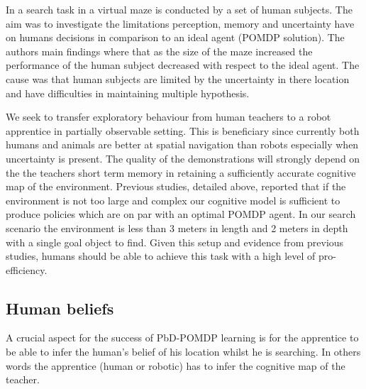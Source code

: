 In \cite{stankiewicz2006lost} a search task in a virtual maze is conducted by a set of human subjects. The aim 
was to investigate the limitations perception, memory and uncertainty have on humans decisions in comparison 
to an ideal agent (POMDP solution). The authors main findings where that as the size of the maze increased the
performance of the human subject decreased with respect to the ideal agent. The cause was that human subjects are limited by the 
uncertainty in there location and have difficulties in maintaining multiple hypothesis.

We seek to transfer exploratory behaviour from human teachers to a robot apprentice in partially observable setting. 
This is beneficiary since currently both humans and animals are better at spatial navigation than robots \cite{stankiewicz2006lost} 
especially when uncertainty is present. The quality of the demonstrations will strongly depend on the the teachers short term memory 
in retaining a sufficiently accurate cognitive map of the environment. Previous studies, detailed above, reported that if 
the environment is not too large and complex our cognitive model is sufficient to produce policies which are on par with an 
optimal POMDP agent. In our search scenario the environment is less than 3 meters in length and 2 meters in depth with a single goal object to find. Given 
this setup and evidence from previous studies, humans should be able to achieve this task with a high level of pro-efficiency. 


\subsection{Human beliefs}


A crucial aspect for the success of PbD-POMDP learning is for the apprentice to be able to infer 
the human's belief of his location whilst he is searching. In others words the apprentice
(human or robotic) has to infer the cognitive map of the teacher. 

